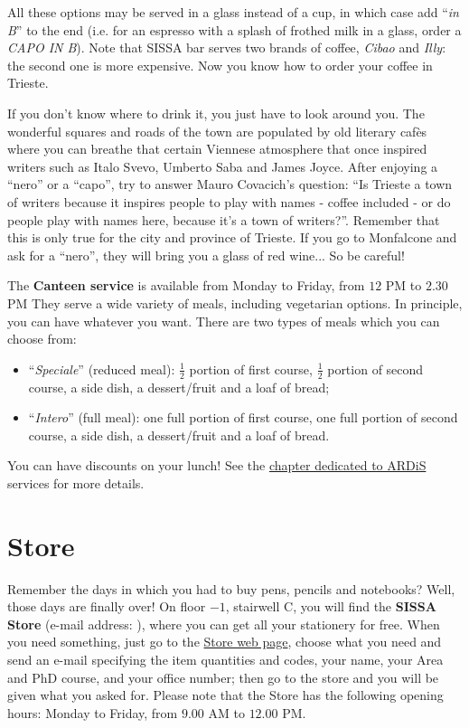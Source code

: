 \documentclass{sissavademecum}
\begin{document}
All these options may be served in a glass instead of a cup, in which case add ``\textit{in B}{}'' to the end (i.e. for an espresso with a splash of frothed milk in a glass, order a \textit{CAPO IN B}). Note that SISSA bar serves two brands of coffee, \textit{Cibao} and \textit{Illy}: the second one is more expensive. Now you know how to order your coffee in Trieste. 

If you don't know where to drink it, you just have to look around you. The wonderful squares and roads of the town are populated by old literary caf\`es where you can breathe that certain Viennese atmosphere that once inspired writers such as Italo Svevo, Umberto Saba and James Joyce. After enjoying a ``nero'' or a ``capo'', try to answer Mauro Covacich's question: ``Is Trieste a town of writers because it inspires people to play with names - coffee included - or do people play with names here, because it's a town of writers?''. Remember that this is only true for the city and province of Trieste. If you go to Monfalcone and ask for a ``nero'', they will bring you a glass of red wine... So be careful!

The \textbf{Canteen service} is available from Monday to Friday, from $12$ PM to $2.30$ PM They serve a wide variety of meals, including vegetarian options. In principle, you can have whatever you want. There are two types of meals which you can choose from:

\begin{itemize}
    \item ``\textit{Speciale}'' (reduced meal): $\frac{1}{2}$ portion of first course, $\frac{1}{2}$ portion of second course, a side dish, a
    dessert/fruit and a loaf of bread;
    \item ``\textit{Intero}'' (full meal): one full portion of first course, one full portion of second course, a side
    dish, a dessert/fruit and a loaf of bread.
\end{itemize}

\noindent You can have discounts on your lunch! See the \hyperlink{ARDiS}{chapter dedicated to ARDiS} services for more details.


\section{Store}\label{sec:Store}

Remember the days in which you had to buy pens, pencils and notebooks? Well, those days are finally over! On floor $-1$, stairwell C, you will find the \textbf{SISSA Store} (e-mail address: ), where you can get all your stationery for free. When you need something, just go to the \href{http://services.sissa.it/store/}{Store web page}, choose what you need and send an e-mail specifying the item quantities and codes, your name, your Area and PhD course, and your office number; then go to the store and you will be given what you asked for. Please note that the Store has the following opening hours: Monday to Friday, from $9.00$ AM to $12.00$ PM.
\end{document}
